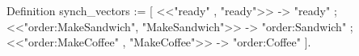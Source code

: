 Definition synch_vectors := 
  [ <<"ready"             , "ready">>        -> "ready"    ;
    <<"order:MakeSandwich", "MakeSandwich">> -> "order:Sandwich" ;
    <<"order:MakeCoffee"  , "MakeCoffee">>   -> "order:Coffee"   ].       